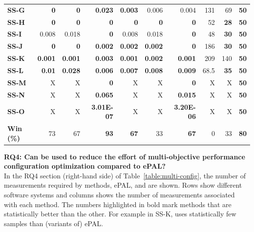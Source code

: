 \begin{table}[]
\begin{tabular}{@{}lrrrrrrrrr@{}}
\textbf{SS-G} & \textbf{0} & \textbf{0} & \textbf{0.023} & \textbf{0.003} & 0.006 & 0.004 & 131 & 69 & \textbf{50} \\
\textbf{SS-H} & \textbf{0} & \textbf{0} & \textbf{0} & \textbf{0} & \textbf{0} & \textbf{0} & 52 & \textbf{28} & \textbf{50} \\
\textbf{SS-I} & 0.008 & 0.018 & \textbf{0} & 0.008 & 0.018 & \textbf{0} & 48 & \textbf{30} & \textbf{50} \\
\textbf{SS-J} & \textbf{0} & \textbf{0} & \textbf{0.002} & \textbf{0.002} & \textbf{0.002} & \textbf{0} & 186 & \textbf{30} & \textbf{50} \\
\textbf{SS-K} & \textbf{0.001} & \textbf{0.001} & \textbf{0.003} & \textbf{0.001} & \textbf{0.002} & \textbf{0.001} & 209 & 140 & \textbf{50} \\
\textbf{SS-L} & \textbf{0.01} & \textbf{0.028} & \textbf{0.006} & \textbf{0.007} & \textbf{0.008} & \textbf{0.009} & 68.5 & \textbf{35} & \textbf{50} \\
\textbf{SS-M} & X & X & \textbf{0} & X & X & \textbf{0} & X & X & \textbf{50} \\
\textbf{SS-N} & X & X & \textbf{0.065} & X & X & \textbf{0.015} & X & X & \textbf{50} \\
\textbf{SS-O} & X & X & \textbf{3.01E-07} & X & X & \textbf{3.20E-06} & X & X & \textbf{50} \\ \midrule
\textbf{Win (\%)} & 73 & 67 & \textbf{93} & \textbf{67} & 33 & \textbf{67} & 0 & 33 & \textbf{80} \\ \bottomrule
\end{tabular}

\end{table}

\newpage
\noindent\textbf{RQ4: Can \flash be used to reduce the effort of multi-objective performance configuration optimization compared to ePAL?}\\
In the RQ4 section (right-hand side) of Table~\ref{table:multi-config}, the number of measurements required by methods, ePAL, and \flash are shown. Rows show different software systems and columns shows the number of measurements associated with each method. The numbers highlighted in bold mark methods that are statistically better than the other. For example in SS-K, \flash uses statistically few samples than (variants of) ePAL. 

